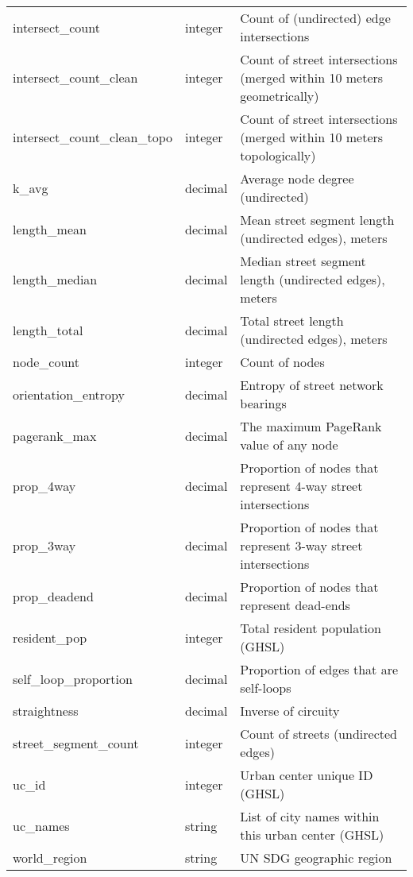 \documentclass[12pt,letterpaper]{article} %
\begin{document}
\begin{table}[bth!]
\begin{tabular}{p{3.0cm} p{1.0cm} p{8.2cm}}
        intersect\_count & integer & Count of (undirected) edge intersections \\
        intersect\_count\_clean & integer & Count of street intersections (merged within 10 meters geometrically) \\
        intersect\_count\_clean\_topo & integer & Count of street intersections (merged within 10 meters topologically) \\
        k\_avg & decimal & Average node degree (undirected) \\
        length\_mean & decimal & Mean street segment length (undirected edges), meters \\
        length\_median & decimal & Median street segment length (undirected edges), meters \\
        length\_total & decimal & Total street length (undirected edges), meters \\
        node\_count & integer & Count of nodes \\
        orientation\_entropy & decimal & Entropy of street network bearings \\
        pagerank\_max & decimal & The maximum PageRank value of any node \\
        prop\_4way & decimal & Proportion of nodes that represent 4-way street intersections \\
        prop\_3way & decimal & Proportion of nodes that represent 3-way street intersections \\
        prop\_deadend & decimal & Proportion of nodes that represent dead-ends \\
        resident\_pop & integer & Total resident population (GHSL) \\
        self\_loop\_proportion & decimal & Proportion of edges that are self-loops \\
        straightness & decimal & Inverse of circuity \\
        street\_segment\_count & integer & Count of streets (undirected edges) \\
        uc\_id & integer & Urban center unique ID (GHSL) \\
        uc\_names & string & List of city names within this urban center (GHSL) \\
        world\_region & string & UN SDG geographic region \\
        \bottomrule
    \end{tabular}
\end{table}
\end{document}
